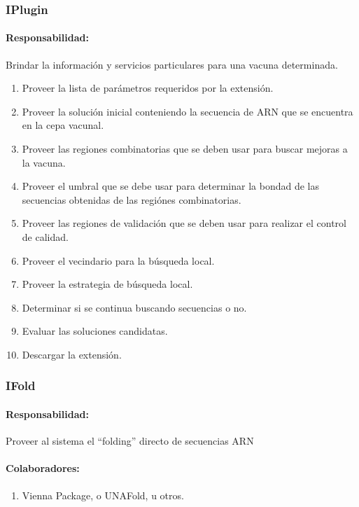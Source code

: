   \subsubsection{IPlugin}
    \paragraph{Responsabilidad:} Brindar la informaci\'on y servicios
particulares para una vacuna determinada.    
      \begin{enumerate}
       \item Proveer la lista de par\'ametros requeridos por la extensi\'on.
       \item Proveer la soluci\'on inicial conteniendo la secuencia de ARN que
se encuentra en la cepa vacunal.
       \item Proveer las regiones combinatorias que se deben usar para buscar
mejoras a la vacuna.
       \item Proveer el umbral que se debe usar para determinar la bondad de las
secuencias obtenidas de las regi\'ones combinatorias.
       \item Proveer las regiones de validaci\'on que se deben usar para
realizar el control de calidad.       
       \item Proveer el vecindario para la b\'usqueda local.
       \item Proveer la estrategia de b\'usqueda local.
       \item Determinar si se continua buscando secuencias o no.
       \item Evaluar las soluciones candidatas.
       \item Descargar la extensi\'on.
      \end{enumerate}

  \subsubsection{IFold}
    \paragraph{Responsabilidad:} Proveer al sistema el ``folding'' directo de
secuencias ARN
    \paragraph{Colaboradores:}
      \begin{enumerate}
       \item Vienna Package, o UNAFold, u otros.
      \end{enumerate}

